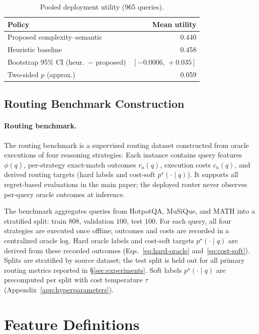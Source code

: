 \begin{table}[h]
  \centering
  \footnotesize
  \caption{Pooled deployment utility (965 queries).}
  \label{tab:pooled-utility}
  \begin{tabular}{@{}lr@{}}
    \toprule
    Policy & Mean utility \\
    \midrule
    Proposed complexity--semantic & 0.440 \\
    Heuristic baseline & 0.458 \\
    \midrule
    Bootstrap 95\% CI (heur.\ $-$ proposed) & $[-0.0006,\,+0.035]$ \\
    Two-sided $p$ (approx.) & 0.059 \\
    \bottomrule
  \end{tabular}
\end{table}

\subsection{Routing Benchmark Construction}
\label{app:benchmark-construction}

\paragraph{Routing benchmark.}
The routing benchmark is a supervised routing dataset constructed from oracle executions of
four reasoning strategies.
Each instance contains query features $\phi(q)$, per-strategy exact-match outcomes
$r_a(q)$, execution costs $c_a(q)$, and derived routing targets (hard labels and cost-soft
$p^\star(\cdot \mid q)$).
It supports all regret-based evaluations in the main paper; the deployed router never
observes per-query oracle outcomes at inference.

The benchmark aggregates queries from HotpotQA, MuSiQue, and MATH into a stratified split:
train $808$, validation $100$, test $100$.
For each query, all four strategies are executed once offline; outcomes and costs are
recorded in a centralized oracle log.
Hard oracle labels and cost-soft targets $p^\star(\cdot \mid q)$ are derived from these
recorded outcomes (Eqs.~\ref{eq:hard-oracle} and~\ref{eq:cost-soft}).
Splits are stratified by source dataset; the test split is held out for all primary
routing metrics reported in \S\ref{sec:experiments}.
Soft labels $p^\star(\cdot \mid q)$ are precomputed per split with cost temperature
$\tau$ (Appendix~\ref{app:hyperparameters}).

\section{Feature Definitions}
\label{app:features}

